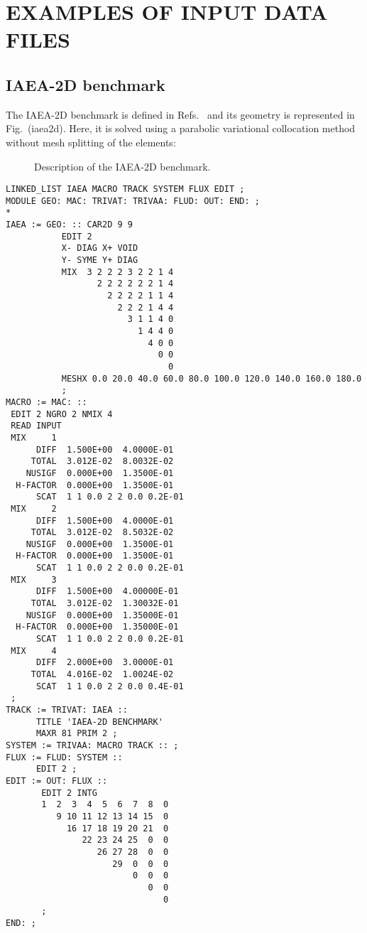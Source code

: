 \section{EXAMPLES OF INPUT DATA FILES}

\subsection{IAEA-2D benchmark}

The IAEA-2D benchmark is defined in Refs.~ and its geometry is represented in Fig.~\fig(iaea2d). Here, it is solved using a parabolic variational collocation method without mesh splitting of the elements:

\begin{figure}[htbp]
\begin{center} 
\epsfxsize=8.0cm
\centerline{ }
\parbox{14cm}{\caption{Description of the IAEA-2D benchmark.}\label{fig:iaea2d}}  \end{center} 
\end{figure}

\begin{verbatim}
LINKED_LIST IAEA MACRO TRACK SYSTEM FLUX EDIT ;
MODULE GEO: MAC: TRIVAT: TRIVAA: FLUD: OUT: END: ;
*
IAEA := GEO: :: CAR2D 9 9
           EDIT 2
           X- DIAG X+ VOID
           Y- SYME Y+ DIAG
           MIX  3 2 2 2 3 2 2 1 4
                  2 2 2 2 2 2 1 4
                    2 2 2 2 1 1 4
                      2 2 2 1 4 4
                        3 1 1 4 0
                          1 4 4 0
                            4 0 0
                              0 0
                                0
           MESHX 0.0 20.0 40.0 60.0 80.0 100.0 120.0 140.0 160.0 180.0
           ;
MACRO := MAC: ::
 EDIT 2 NGRO 2 NMIX 4
 READ INPUT
 MIX     1
      DIFF  1.500E+00  4.0000E-01
     TOTAL  3.012E-02  8.0032E-02
    NUSIGF  0.000E+00  1.3500E-01
  H-FACTOR  0.000E+00  1.3500E-01
      SCAT  1 1 0.0 2 2 0.0 0.2E-01
 MIX     2
      DIFF  1.500E+00  4.0000E-01
     TOTAL  3.012E-02  8.5032E-02
    NUSIGF  0.000E+00  1.3500E-01
  H-FACTOR  0.000E+00  1.3500E-01
      SCAT  1 1 0.0 2 2 0.0 0.2E-01
 MIX     3
      DIFF  1.500E+00  4.00000E-01
     TOTAL  3.012E-02  1.30032E-01
    NUSIGF  0.000E+00  1.35000E-01
  H-FACTOR  0.000E+00  1.35000E-01
      SCAT  1 1 0.0 2 2 0.0 0.2E-01
 MIX     4
      DIFF  2.000E+00  3.0000E-01
     TOTAL  4.016E-02  1.0024E-02
      SCAT  1 1 0.0 2 2 0.0 0.4E-01
 ;
TRACK := TRIVAT: IAEA ::
      TITLE 'IAEA-2D BENCHMARK'
      MAXR 81 PRIM 2 ;
SYSTEM := TRIVAA: MACRO TRACK :: ;
FLUX := FLUD: SYSTEM ::
      EDIT 2 ;
EDIT := OUT: FLUX ::
       EDIT 2 INTG
       1  2  3  4  5  6  7  8  0
          9 10 11 12 13 14 15  0
            16 17 18 19 20 21  0
               22 23 24 25  0  0
                  26 27 28  0  0
                     29  0  0  0
                         0  0  0
                            0  0
                               0
       ;
END: ;
\end{verbatim}

